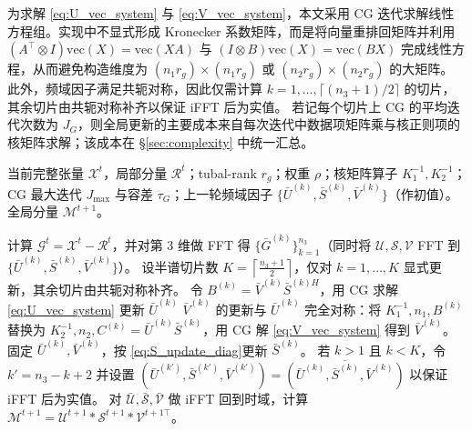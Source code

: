 \documentclass[UTF8]{ctexart}
\begin{document}
为求解 \eqref{eq:U_vec_system} 与 \eqref{eq:V_vec_system}，本文采用 CG 迭代求解线性方程组。实现中不显式形成 Kronecker 系数矩阵，而是将向量重排回矩阵并利用
$(A^{\top}\!\otimes I)\mathrm{vec}(X)=\mathrm{vec}(XA)$ 与 $(I\otimes B)\mathrm{vec}(X)=\mathrm{vec}(BX)$
完成线性方程，从而避免构造维度为 $(n_1 r_g)\times(n_1 r_g)$ 或 $(n_2 r_g)\times(n_2 r_g)$ 的大矩阵。
此外，频域因子满足共轭对称，因此仅需计算 $k=1,\dots,\lceil(n_3+1)/2\rceil$ 的切片，其余切片由共轭对称补齐以保证 iFFT 后为实值。
若记每个切片上 CG 的平均迭代次数为 $J_G$，则全局更新的主要成本来自每次迭代中数据项矩阵乘与核正则项的核矩阵求解；该成本在 \S\ref{sec:complexity} 中统一汇总。
\begin{algorithm}[!htbp]
\caption{更新全局因子}
\label{alg:update_global}
\begin{algorithmic}[1]
\Require 当前完整张量 $\mathcal{X}^{t}$，局部分量 $\mathcal{R}^{t}$；tubal-rank $r_g$；权重 $\rho$；核矩阵算子 $K_1^{-1},K_2^{-1}$；
CG 最大迭代 $J_{\max}$ 与容差 $\tau_G$；上一轮频域因子 $\{\bar U^{(k)},\bar S^{(k)},\bar V^{(k)}\}$（作初值）。
\Ensure 全局分量 $\mathcal{M}^{t+1}$。

\State 计算 $\mathcal{G}^{t}=\mathcal{X}^{t}-\mathcal{R}^{t}$，并对第 $3$ 维做 FFT 得 $\{\bar G^{(k)}\}_{k=1}^{n_3}$（同时将 $\mathcal{U},\mathcal{S},\mathcal{V}$ FFT 到 $\{\bar U^{(k)},\bar S^{(k)},\bar V^{(k)}\}$）。
\State 设半谱切片数 $K=\left\lceil\frac{n_3+1}{2}\right\rceil$，仅对 $k=1,\ldots,K$ 显式更新，其余切片由共轭对称补齐。
    \State 令 $B^{(k)}=\bar V^{(k)}\bar S^{(k)H}$，用 CG 求解 \eqref{eq:U_vec_system} 更新 $\bar U^{(k)}$
    \State $\bar V^{(k)}$ 的更新与 $\bar U^{(k)}$ 完全对称：将 $K_1^{-1},n_1,B^{(k)}$ 替换为 $K_2^{-1},n_2,C^{(k)}=\bar U^{(k)}\bar S^{(k)}$，用 CG 解 \eqref{eq:V_vec_system} 得到 $\bar V^{(k)}$。
    \State 固定 $\bar U^{(k)},\bar V^{(k)}$，按 \eqref{eq:S_update_diag}更新 $\bar S^{(k)}$。
    \State 若 $k>1$ 且 $k<K$，令 $k'=n_3-k+2$ 并设置 $(\bar U^{(k')},\bar S^{(k')},\bar V^{(k')})=\overline{(\bar U^{(k)},\bar S^{(k)},\bar V^{(k)})}$ 以保证 iFFT 后为实值。
\EndFor
\State 对 $\bar{\mathcal{U}},\bar{\mathcal{S}},\bar{\mathcal{V}}$ 做 iFFT 回到时域，计算 $\mathcal{M}^{t+1}=\mathcal{U}^{t+1}*\mathcal{S}^{t+1}*\mathcal{V}^{t+1\top}$。
\end{algorithmic}
\end{algorithm}
\end{document}
